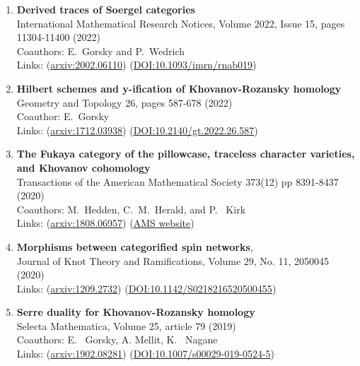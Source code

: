 \documentclass[12pt]{amsart}
\begin{document}
\begin{enumerate}
\item {\bf Derived traces of Soergel categories}\\
International Mathematical Research Notices, Volume 2022, Issue 15, pages 11304-11400 (2022)\\
Coauthors: E.~Gorsky and P.~Wedrich\\ 
Links: (\href{https://arxiv.org/abs/2002.06110}{arxiv:2002.06110}) (\href{https://doi.org/10.1093/imrn/rnab019}{DOI:10.1093/imrn/rnab019})

\item{\bf Hilbert schemes and y-ification of Khovanov-Rozansky homology}\\
Geometry and Topology 26, pages 587-678 (2022)\\
Coauthor: E.~Gorsky\\ 
Links: (\href{https://arxiv.org/abs/1712.03938}{arxiv:1712.03938}) (\href{https://doi.org/10.2140/gt.2022.26.587}{DOI:10.2140/gt.2022.26.587})

\item {\bf The Fukaya category of the pillowcase, traceless character varieties, and Khovanov cohomology}\\
Transactions of the American Mathematical Society 373(12) pp 8391-8437 (2020)\\
Coauthors: M.~Hedden, C.~M.~Herald, and P.~ Kirk\\
Links: (\href{https://arxiv.org/abs/1808.06957}{arxiv:1808.06957}) (\href{https://www.ams.org/journals/tran/2020-373-12/S0002-9947-2020-08116-1/}{AMS website})


\item{\bf Morphisms between categorified spin networks},\\
Journal of Knot Theory and Ramifications, Volume 29, No. 11, 2050045 (2020)\\
Links: (\href{http://arxiv.org/abs/1209.2732}{arxiv:1209.2732}) (\href{https://doi.org/10.1142/S0218216520500455}{DOI:10.1142/S0218216520500455})

\item {\bf Serre duality for Khovanov-Rozansky homology}\\
Selecta Mathematica, Volume 25, article 79 (2019)\\
Coauthors: E.~ Gorsky, A. Mellit, K.~ Nagane\\
Links: (\href{http://arxiv.org/abs/1902.08281}{arxiv:1902.08281}) (\href{https://doi.org/10.1007/s00029-019-0524-5}{DOI:10.1007/s00029-019-0524-5})



\end{enumerate}
\end{document}
